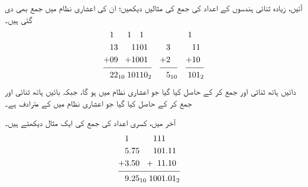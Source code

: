 آئیں،  زیادہ ثنائی ہندسوں کے اعداد کی  جمع   کی  مثالیں  دیکھیں؛ ان کی  اعشاری نظام میں  جمع  بھی دی گئی ہیں۔
\begin{align*}
\begin{split}
&1\\
&13\\
+&09\\
\noalign{\smallskip}\hline\noalign{\smallskip}
&22_{10}
\end{split}&
\begin{split}
1&\phantom{11}1\\
&1101\\
+&1001\\
\noalign{\smallskip}\hline\noalign{\smallskip}
1&0110_2
\end{split}&&
\begin{split}
&\\
&3\\
+&2\\
\noalign{\smallskip}\hline\noalign{\smallskip}
&5_{10}
\end{split}&
\begin{split}
1&\\
&11\\
+&10\\
\noalign{\smallskip}\hline\noalign{\smallskip}
1&01_2
\end{split}
\end{align*}
دائیں ہاتھ ثنائی  اور  جمع کر کے  حاصل کیا گیا جو اعشاری نظام میں  ہو گا، جبکہ  بائیں ہاتھ ثنائی  اور  جمع کر کے  حاصل کیا گیا   جو اعشاری نظام میں  کے مترادف ہے۔

آخر میں، کسری اعداد کی جمع  کی ایک مثال دیکھتے ہیں۔
\begin{align*}
\begin{split}
&1\\
&5.75\\
+&3.50\\
\noalign{\smallskip}\hline\noalign{\smallskip}
&9.25_{10}
\end{split}&
\begin{split}
&111\\
&101.11\\
+&\phantom{1}11.10\\
\noalign{\smallskip}\hline\noalign{\smallskip}
1&001.01_2
\end{split}
\end{align*}


